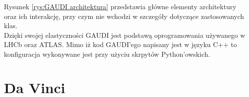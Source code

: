 Rysunek \ref{rys:GAUDI architektura} przedstawia główne elementy architektury oraz ich interakcję, przy czym nie wchodzi w szczegóły dotyczące zastosowanych klas. \\
Dzięki swojej elastyczności GAUDI jest podstawą oprogramowania używanego w LHCb oraz ATLAS.
Mimo iż kod GAUDI'ego napisany jest w języku C++ to konfiguracja wykonywane jest przy użyciu skrpytów Python'owskich.

\section{Da Vinci}

